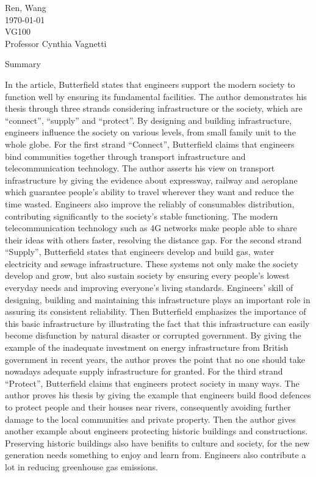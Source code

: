 \documentclass[12pt,a4]{article}
\begin{document}
\begin{flushleft}
Ren, Wang\\
\today\\
VG100\\
Professor Cynthia Vagnetti \\
\end{flushleft}

\begin{center}
Summary
\end{center}


In the article, Butterfield \cite{but} states that engineers support the modern
society to function well by ensuring its fundamental facilities. 
The author demonstrates his thesis through three strands considering
infrastructure or the society, which are ``connect'', ``supply'' and
``protect''. 
By designing and building infrastructure, engineers influence the society on
various levels, from small family unit to the whole globe.  
%
%
For the first strand ``Connect'', Butterfield claims that engineers bind
communities together through transport infrastructure and telecommunication
technology.
The author asserts his view on transport infrastructure by giving the evidence
about expressway, railway and aeroplane which guarantee people's ability to
travel wherever they want and reduce the time wasted. 
Engineers also improve the reliably of consumables distribution, contributing
significantly to the society's stable functioning. 
The modern telecommunication technology such as 4G networks make people able to
share their ideas with others faster, resolving the distance gap. 
%
%
For the second strand ``Supply'', Butterfield states that engineers develop and
build gas, water electricity and sewage infrastructure.
These systems not only make the society develop and grow, but also sustain
society by ensuring every people's lowest everyday needs and improving
everyone's living standards. 
Engineers' skill of designing, building and maintaining this infrastructure
plays an important role in assuring its consistent reliability.
Then Butterfield emphasizes the importance of this basic infrastructure by
illustrating the fact that this infrastructure can easily become disfunction by
natural disaster or corrupted government.
By giving the example of the inadequate investment on energy infrastructure from
British government in recent years, the author proves the point that no one
should take nowadays adequate supply infrastructure for granted. 
%
%
For the third strand ``Protect'', Butterfield claims that engineers protect
society in many ways.
The author proves his thesis by giving the example that engineers build flood
defences to protect people and their houses near rivers, consequently avoiding
further damage to the local communities and private property.
Then the author gives another example about engineers protecting historic
buildings and constructions.
Preserving historic buildings also have benifits to culture and society, for the
new generation needs something to enjoy and learn from.
Engineers also contribute a lot in reducing greenhouse gas emissions.
%
%
%




\newpage


\end{document}
